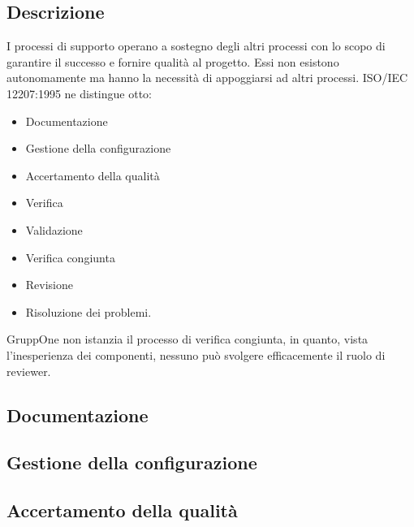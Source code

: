 \documentclass[../norme-di-progetto.tex]{subfiles}
\begin{document}
\subsection{Descrizione}%
\label{sub:processi_di_supporto/descrizione}

I processi di supporto operano a sostegno degli altri processi con lo scopo di garantire il successo e fornire qualità al progetto.
Essi non esistono autonomamente ma hanno la necessità di appoggiarsi ad altri processi.
ISO/IEC 12207:1995 ne distingue otto:

\begin{itemize}
  \item Documentazione
  \item Gestione della configurazione
  \item Accertamento della qualità
  \item Verifica
  \item Validazione
  \item Verifica congiunta
  \item Revisione
  \item Risoluzione dei problemi.
\end{itemize}

GruppOne non istanzia il processo di verifica congiunta, in quanto, vista l'inesperienza dei componenti, nessuno può svolgere efficacemente il ruolo di reviewer.

\subsection{Documentazione}%
\label{sub:documentazione}



\subsection{Gestione della configurazione}%
\label{sub:gestione_della_configurazione}



\subsection{Accertamento della qualità}%
\label{sub:accertamento_della_qualita}


\end{document}
